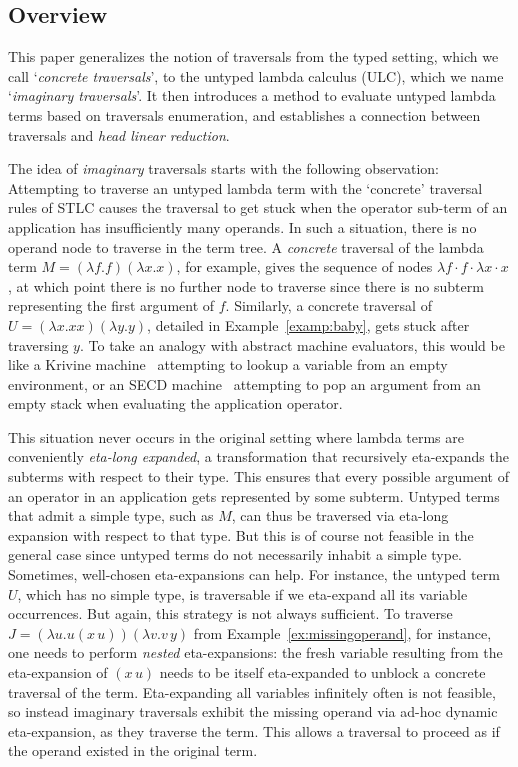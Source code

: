 \documentclass{elsarticle}
\theoremstyle{plain}
\theoremstyle{definition}
\begin{document}
\subsection{Overview}
This paper generalizes the notion of traversals from the typed setting, which we call `\emph{concrete traversals}', to the untyped lambda calculus (ULC), which we name `\emph{imaginary traversals}'.
It then introduces a method to evaluate untyped lambda terms based on traversals enumeration, and establishes a connection between traversals and \emph{head linear reduction}.

The idea of \emph{imaginary} traversals starts with the following observation:
Attempting to traverse an untyped lambda term with the
`concrete' traversal rules of STLC causes the traversal to get stuck when the operator sub-term of an application has insufficiently many operands. In such a situation, there is no operand node to traverse in the term tree.
A \emph{concrete} traversal of the lambda term $M = (\lambda f.f)(\lambda x.x)$, for example, gives the sequence of nodes $\lambda f \cdot f \cdot \lambda x \cdot x$, at which point there is no further node to traverse since there is no subterm representing the first argument of $f$.
Similarly, a concrete traversal of $U = (\lambda x. x x)(\lambda y. y)$,
detailed in Example~\ref{examp:baby}, gets stuck after traversing $y$. To take an analogy with abstract machine evaluators, this would be like a Krivine machine~\cite{Krivine2007} attempting to lookup a variable from an empty environment, or an SECD machine~\cite{landin-secd} attempting to pop an argument from an empty stack when evaluating the application operator.

This situation never occurs in the original setting where lambda terms are
conveniently \emph{eta-long expanded}, a transformation that recursively eta-expands the subterms with respect to their type.
This ensures that every possible argument of an operator in an application gets represented by some subterm.
%
Untyped terms that admit a simple type, such as $M$, can thus be traversed via eta-long expansion with respect to that type.
But this is of course not feasible in the general case since untyped terms do not necessarily inhabit a simple type.
Sometimes, well-chosen eta-expansions can help. For instance, the untyped term $U$, which has no simple type, is traversable if we eta-expand all its variable occurrences. But again, this strategy is not always sufficient. To traverse $J = (\lambda u . u(x\, u)) (\lambda v . v\, y)$ from
 Example~\ref{ex:missingoperand}, for instance, one needs to perform \emph{nested} eta-expansions:
 the fresh variable resulting from the eta-expansion of $(x\, u)$ needs to be itself eta-expanded to unblock a concrete traversal of the term.
 Eta-expanding all variables infinitely often is not feasible, so instead imaginary traversals exhibit the missing operand via ad-hoc dynamic eta-expansion, as they traverse the term.
 This allows a traversal to proceed as if the operand existed in the original term.
\end{document}
